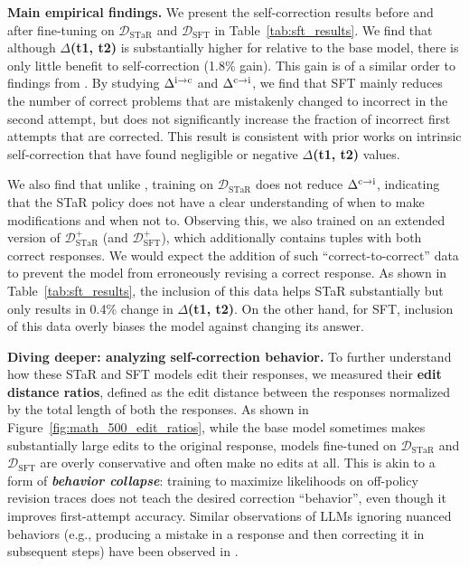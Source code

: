 \textbf{Main empirical findings.} We present the self-correction results before and after fine-tuning on $\mathcal{D}_{\mathrm{STaR}}$ and $\mathcal{D}_{\mathrm{SFT}}$ in Table~\ref{tab:sft_results}. We find that although $\Delta$\textbf{(t1, t2)} is substantially higher for \pairsft{} relative to the base model, there is only little benefit to self-correction (1.8\% gain). This gain is of a similar order to findings from \citet{qu2024recursive}. By studying $\Delta^{\mathrm{i} \rightarrow \mathrm{c}}$ and $\Delta^{\mathrm{c} \rightarrow \mathrm{i}}$, we find that SFT mainly reduces the number of correct problems that are mistakenly changed to incorrect in the second attempt, but does not significantly increase the fraction of incorrect first attempts that are corrected. This result is consistent with prior works on intrinsic self-correction that have found negligible or negative $\Delta$\textbf{(t1, t2)} values.

We also find that unlike \pairsft{}, training on $\mathcal{D}_{\mathrm{STaR}}$ does not reduce $\Delta^{\mathrm{c} \rightarrow \mathrm{i}}$, indicating that the STaR policy does not have a clear understanding of when to make modifications and when not to.
Observing this, we also trained on an extended version of $\mathcal{D}_{\mathrm{STaR}}^+$ (and $\mathcal{D}_{\mathrm{SFT}}^+$), which additionally contains tuples with both correct responses. We would expect the addition of such ``correct-to-correct'' data to prevent the model from erroneously revising a correct response. As shown in Table~\ref{tab:sft_results}, the inclusion of this data helps STaR substantially but only results in 0.4\%  change in $\Delta$\textbf{(t1, t2)}. On the other hand, for SFT, inclusion of this data overly biases the model against changing its answer.

\textbf{Diving deeper: analyzing self-correction behavior.} To further understand how these STaR and SFT models edit their responses, we measured their \textbf{edit distance ratios}, defined as the edit distance between the responses normalized by the total length of both the responses. As shown in Figure~\ref{fig:math_500_edit_ratios}, while the base model sometimes makes substantially large edits to the original response, models fine-tuned on $\mathcal{D}_{\mathrm{STaR}}$ and $\mathcal{D}_{\mathrm{SFT}}$ are overly conservative and often make no edits at all. This is akin to a form of \emph{\textbf{behavior collapse}}: training to maximize likelihoods on off-policy revision traces does not teach the desired correction ``behavior'', even though it improves first-attempt accuracy. Similar observations of LLMs ignoring nuanced behaviors (e.g., producing a mistake in a response and then correcting it in subsequent steps) have been observed in \citet{ye2024physicslanguagemodels22}. 

